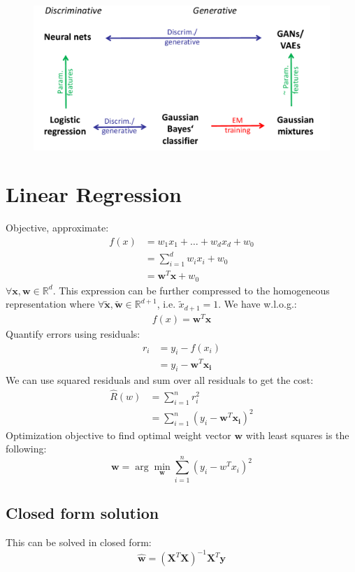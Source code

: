 \documentclass[a4paper,10pt,twoside]{article}
\begin{document}
\begin{figure}[H]

  \includegraphics[width=.8\textwidth]{figures/overview_4.png}
\end{figure}
\section{Linear Regression}
Objective, approximate:
\begin{align*}
    f(x) &= w_1x_1+\ldots+w_dx_d+w_0\\
        &= \sum_{i=1}^{d}w_ix_i+w_0\\
        &= \mathbf{w}^{T}\mathbf{x}+w_0
\end{align*}
$\forall \mathbf{x}, \mathbf{w}\in\mathbb{R}^{d}$. This expression can be further compressed to the homogeneous representation where $\forall \mathbf{\tilde{x}}, \mathbf{\tilde{w}}\in\mathbb{R}^{d+1}$, i.e. $\tilde{x}_{d+1}=1$. We have w.l.o.g.:
\begin{align*}
f(x) = \mathbf{w}^{T}\mathbf{x}
\end{align*}
Quantify errors using residuals:
\begin{align*}
    r_i &= y_i-f(x_i)\\
        &= y_i-\mathbf{w}^{T}\mathbf{x_i}
\end{align*}
We can use squared residuals and sum over all residuals to get the cost:
\begin{align}
    \label{objective_lse}
    \hat{R}(w) &= \sum_{i=1}^{n}r_i^2\\
               &= \sum_{i=1}^{n}(y_i-\mathbf{w}^{T}\mathbf{x_i})^2
\end{align}
Optimization objective to find optimal weight vector $\mathbf{w}$ with least squares is the following:
\begin{equation*}
    \mathbf{w} = \arg\min_{\mathbf{w}}\displaystyle\sum_{i=1}^{n}\left(y_i-w^{T}x_i\right)^2
\end{equation*}

\subsection{Closed form solution}
This can be solved in closed form:
\begin{equation*}
    \mathbf{\hat{w}} = (\mathbf{X}^{T}\mathbf{X})^{-1}\mathbf{X}^{T}\mathbf{y}
\end{equation*}
\end{document}
